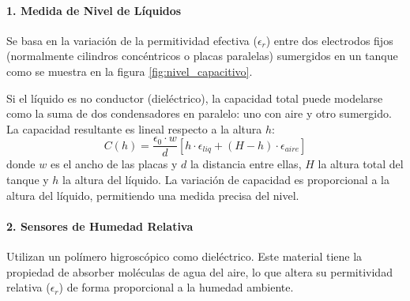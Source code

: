 \paragraph{1. Medida de Nivel de Líquidos}
Se basa en la variación de la permitividad efectiva ($\epsilon_r$) entre dos electrodos fijos (normalmente cilindros concéntricos o placas paralelas) sumergidos en un tanque como se muestra en la figura \ref{fig:nivel_capacitivo}. 

\begin{marginfigure}
    \centering
    \shorthandoff{>}
    \caption[Medida de nivel capacitiva.]{Medida de nivel capacitiva. El líquido actúa como un dieléctrico variable que rellena el espacio entre las placas a medida que sube el nivel $h$.}\label{fig:nivel_capacitivo}
\end{marginfigure}

Si el líquido es no conductor (dieléctrico), la capacidad total puede modelarse como la suma de dos condensadores en paralelo: uno con aire y otro sumergido. La capacidad resultante es lineal respecto a la altura $h$:
\begin{equation}
    C(h) = \frac{\epsilon_0 \cdot w}{d} \left[ h \cdot \epsilon_{liq} + (H - h) \cdot \epsilon_{aire} \right]
\end{equation}
donde $w$ es el ancho de las placas y $d$ la distancia entre ellas, $H$ la altura total del tanque y $h$ la altura del líquido. La variación de capacidad es proporcional a la altura del líquido, permitiendo una medida precisa del nivel.

\paragraph{2. Sensores de Humedad Relativa}
Utilizan un polímero higroscópico como dieléctrico. Este material tiene la propiedad de absorber moléculas de agua del aire, lo que altera su permitividad relativa ($\epsilon_r$) de forma proporcional a la humedad ambiente. 

